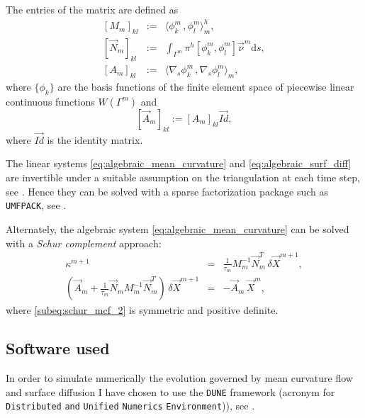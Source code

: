 \documentclass[a4paper,11pt, onecolumn]{article}
\newcommand{\cor}[1]{\textit{#1}} %
\begin{document}
\noindent The entries of the matrix are defined as
\begin{eqnarray}\label{eq:algebraic_entries}
 \left[ M_m \right]_{kl} & := & \langle \phi_k^m \, , \phi_l^m \rangle_m^h, \\
 \left[ \vec{N}_m \right]_{kl} & := & \int_{\Gamma^m} \pi^h \left[ \phi_k^m , \phi_l^m \right] \vec{\nu}^m \mathrm{d}s, \\
 \left[ A_m \right]_{kl} & := & \langle \nabla_s \phi_k^m \, , \nabla_s \phi_l^m \rangle_m,
\end{eqnarray}
where $\{\phi_k\}$ are the basis functions of the finite element space of piecewise linear continuous functions $W(\Gamma^m)$ and
\begin{equation}\label{eq:algebraic_entries_vector}
 [\vec{A}_m]_{kl} := [A_m]_{kl} \vec{Id},
\end{equation}
where $\vec{Id}$ is the identity matrix.
\newline

\noindent The linear systems \eqref{eq:algebraic_mean_curvature} and \eqref{eq:algebraic_surf_diff} are invertible under a suitable assumption on the triangulation at each time step, see \cite{gflows3d}. Hence they can be solved with a sparse factorization package such as \verb|UMFPACK|, see \cite{Davis04}.
\newline 

\noindent Alternately, the algebraic system \eqref{eq:algebraic_mean_curvature} can be solved with a \cor{Schur complement} approach:
\begin{subequations}
 \begin{eqnarray}
  \kappa^{m + 1} & = & \frac{1}{\tau_m} M_m^{-1} \vec{N}^{T}_m \, \delta \vec{X}^{m + 1} \label{subeq:schur_mcf_1} , \\
  (\vec{A}_m + \frac{1}{\tau_m} \vec{N}_m M_m^{-1} \vec{N}^{T}_m) \, \delta \vec{X}^{m + 1} & = & - \vec{A}_m \, \vec{X}^{m} , \label{subeq:schur_mcf_2}
 \end{eqnarray}
\end{subequations}
where \eqref{subeq:schur_mcf_2} is symmetric and positive definite.

\subsection{Software used}

In order to simulate numerically the evolution governed by mean curvature flow and surface diffusion I have chosen to use the \verb|DUNE| framework (acronym for \verb|Distributed| \verb|and| \verb|Unified| \verb|Numerics| \verb|Environment|)), see \cite{dunegridpaperI08,dunegridpaperII08,ISTL,ISTLParallel}. 
\end{document}
